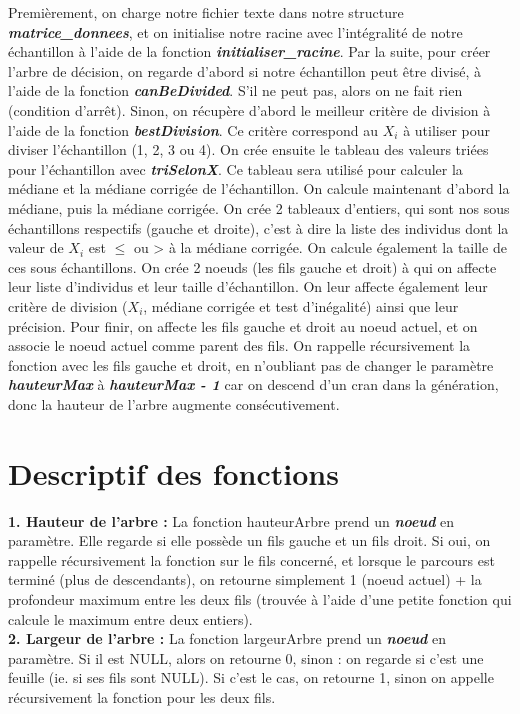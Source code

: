 Premièrement, on charge notre fichier texte dans notre structure \textbf{\textit{matrice\_donnees}}, et on initialise notre racine avec l'intégralité de notre échantillon à l'aide de la fonction \textbf{\textit{initialiser\_racine}}.
Par la suite, pour créer l'arbre de décision, on regarde d'abord si notre échantillon peut être divisé, à l'aide de la fonction \textbf{\textit{canBeDivided}}. S'il ne peut pas, alors on ne fait rien (condition d'arrêt). Sinon, on récupère d'abord le meilleur critère de division à l'aide de la fonction \textbf{\textit{bestDivision}}. Ce critère correspond au $X_{i}$ à utiliser pour diviser l'échantillon (1, 2, 3 ou 4). On crée ensuite le tableau des valeurs triées pour l'échantillon avec \textbf{\textit{triSelonX}}. Ce tableau sera utilisé pour calculer la médiane et la médiane corrigée de l'échantillon. On calcule maintenant d'abord la médiane, puis la médiane corrigée. On crée 2 tableaux d'entiers, qui sont nos sous échantillons respectifs (gauche et droite), c'est à dire la liste des individus dont la valeur de $X_{i}$ est $\le$ ou > à la médiane corrigée. On calcule également la taille de ces sous échantillons.
On crée 2 noeuds (les fils gauche et droit) à qui on affecte leur liste d'individus et leur taille d'échantillon. On leur affecte également leur critère de division ($X_{i}$, médiane corrigée et test d'inégalité) ainsi que leur précision.
Pour finir, on affecte les fils gauche et droit au noeud actuel, et on associe le noeud actuel comme parent des fils. On rappelle récursivement la fonction avec les fils gauche et droit, en n'oubliant pas de changer le paramètre \textbf{\textit{hauteurMax}} à \textbf{\textit{hauteurMax - 1}} car on descend d'un cran dans la génération, donc la hauteur de l'arbre augmente consécutivement.

\chapter*{\textcolor{carmillon}{Descriptif des fonctions}}
\textbf{1. Hauteur de l'arbre :} La fonction hauteurArbre prend un \textbf{\textit{noeud}} en paramètre. Elle regarde si elle possède un fils gauche et un fils droit. Si oui, on rappelle récursivement la fonction sur le fils concerné, et lorsque le parcours est terminé (plus de descendants), on retourne simplement 1 (noeud actuel) + la profondeur maximum entre les deux fils (trouvée à l'aide d'une petite fonction qui calcule le maximum entre deux entiers).\\

\noindent
\textbf{2. Largeur de l'arbre :} La fonction largeurArbre prend un \textbf{\textit{noeud}} en paramètre. Si il est NULL, alors on retourne 0, sinon : on regarde si c'est une feuille (ie. si ses fils sont NULL). Si c'est le cas, on retourne 1, sinon on appelle récursivement la fonction pour les deux fils.\\

